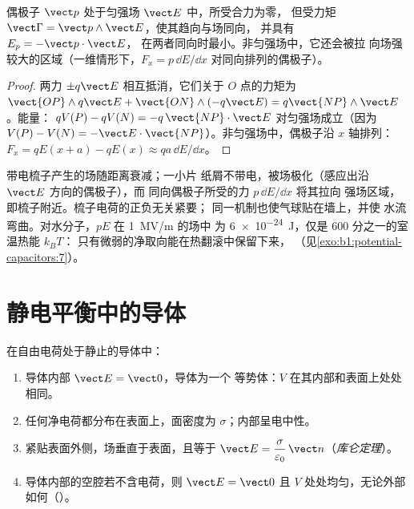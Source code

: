 \begin{proposition}[外场中的偶极子]\label{prop:b1:potential-capacitors:dipoleinfield}
偶极子 $\vect p$ 处于匀强场 $\vect E$ 中，所受合力为零，
但受力矩 $\vect\Gamma = \vect p\wedge\vect E$，使其趋向与场同向，
并具有 $E_p = -\vect p\cdot\vect E$，
在两者同向时最小。非匀强场中，它还会被拉
向场强较大的区域（一维情形下，$F_x = p\,\dd E/\dd x$
对同向排列的偶极子）。
\end{proposition}

\begin{proof}
两力 $\pm q\vect E$ 相互抵消，它们关于 $O$ 点的力矩为 $\vect{OP}\wedge
q\vect E + \vect{ON}\wedge(-q\vect E) = q\vect{NP}\wedge\vect E$。能量：
$qV(P) - qV(N) = -q\,\vect{NP}\cdot\vect E$ 对匀强场成立（因为 $V(P)
- V(N) = -\vect E\cdot\vect{NP}$）。非匀强场中，偶极子沿 $x$ 轴排列：$F_x =
qE(x + a) - qE(x) \approx qa\,\dd E/\dd x$。
\end{proof}

\begin{example}[梳子为何能吸引纸屑]\label{ex:b1:potential-capacitors:comb}
带电梳子产生的场随距离衰减；一小片
纸屑不带电，被场极化（感应出沿 $\vect E$ 方向的偶极子），而
同向偶极子所受的力 $p\,\dd E/\dd x$ 将其拉向
强场区域，即梳子附近。梳子电荷的正负无关紧要；
同一机制也使气球贴在墙上，并使
水流弯曲。对水分子，$pE$ 在 \qty{1}{MV/m} 的场中
为 \qty{6e-24}{J}，仅是 $600$ 分之一的室温热能 $k_BT$：
只有微弱的净取向能在热翻滚中保留下来，
（见\cref{exo:b1:potential-capacitors:7}）。
\end{example}

\section{静电平衡中的导体}

\begin{theorem}[平衡导体的性质]\label{thm:b1:potential-capacitors:conductor}
在自由电荷处于静止的导体中：
\begin{enumerate}
  \item 导体内部 $\vect E = \vect 0$，导体为一个
        等势体：$V$ 在其内部和表面上处处相同。
  \item 任何净电荷都分布在表面上，面密度为
        $\sigma$；内部呈电中性。
  \item 紧贴表面外侧，场垂直于表面，且等于
        $\vect E = \dfrac{\sigma}{\varepsilon_0}\,\vect n$（\emph{库仑定理}）。
  \item 导体内部的空腔若不含电荷，则 $\vect E =
        \vect 0$ 且 $V$ 处处均匀，无论外部如何（\emph{}）。
\end{enumerate}
\end{theorem}

